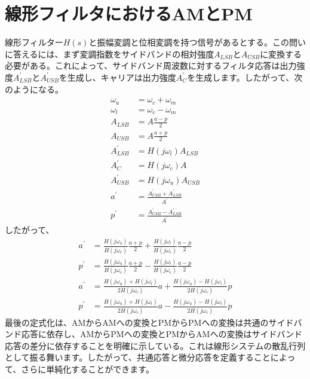\documentclass[article]{jlreq}
\begin{document}
\section{線形フィルタにおけるAMとPM}
%
線形フィルター$H(s)$と振幅変調と位相変調を持つ信号があるとする。この問いに答えるには、まず変調指数をサイドバンドの相対強度$A_{LSB}$と$A_{USB}$に変換する必要がある。これによって、サイドバンド周波数に対するフィルタ応答は出力強度$A^{\prime}_{LSB}$と$A^{\prime}_{USB}$を生成し、キャリアは出力強度$A^{\prime}_C$を生成します。したがって、次のようになる。
%
\begin{align}
    \omega_u         & = \omega_c + \omega_m                                    \\
    \omega_l         & = \omega_c - \omega_m                                    \\
    A_{LSB}          & = A\frac{a-p}{2}                                         \\
    A_{USB}          & = A\frac{a+p}{2}                                         \\
    A^{\prime}_{LSB} & = H(j\omega_l)A_{LSB}                                    \\
    A^{\prime}_C     & = H(j\omega_c)A                                          \\
    A^{\prime}_{USB} & = H(j\omega_u)A_{USB}                                    \\
    a^{\prime}       & = \frac{A^{\prime}_{USB} + A^{\prime}_{LSB}}{A^{\prime}} \\
    p^{\prime}       & = \frac{A^{\prime}_{USB} - A^{\prime}_{LSB}}{A^{\prime}}
\end{align}
%
したがって、
%
\begin{align}
    a^{\prime} & = \frac{H(j\omega_u)}{H(j\omega_c)}\frac{a+p}{2}+\frac{H(j\omega_l)}{H(j\omega_c)}\frac{a-p}{2}       \\
    p^{\prime} & = \frac{H(j\omega_u)}{H(j\omega_c)}\frac{a+p}{2}-\frac{H(j\omega_l)}{H(j\omega_c)}\frac{a-p}{2}       \\
    a^{\prime} & = \frac{H(j\omega_u)+H(j\omega_l)}{2H(j\omega_c)}a + \frac{H(j\omega_u)-H(j\omega_l)}{2H(j\omega_c)}p \\
    p^{\prime} & = \frac{H(j\omega_u)+H(j\omega_l)}{2H(j\omega_c)}a - \frac{H(j\omega_u)-H(j\omega_l)}{2H(j\omega_c)}p
\end{align}
%
最後の定式化は、AMからAMへの変換とPMからPMへの変換は共通のサイドバンド応答に依存し、AMからPMへの変換とPMからAMへの変換はサイドバンド応答の差分に依存することを明確に示している。これは線形システムの散乱行列として振る舞います。したがって、共通応答と微分応答を定義することによって、さらに単純化することができます。
\end{document}
